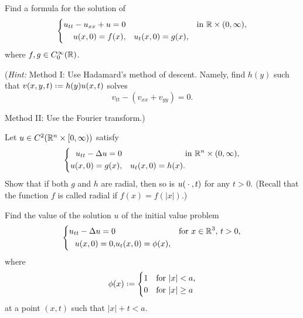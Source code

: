 \begin{problem}
  Find a formula for the solution of
  \[
    \left\{
      \begin{aligned}
        u_{tt}-u_{xx}+u=0&&&&\text{in \(\mathbb{R}\times(0,\infty)\),}\\
        u(x,0)=f(x),&&u_t(x,0)=g(x),
      \end{aligned}
    \right.
  \]
  where \(f,g\in C_0^\infty(\mathbb{R})\).

  \noindent (\emph{Hint:} Method I: Use Hadamard's method of
  descent. Namely, find \(h(y)\) such that \(v(x,y,t)\defeq h(y)u(x,t)\)
  solves
  \[
    v_{tt}-(v_{xx}+v_{yy})=0.
  \]

  \noindent Method II: Use the Fourier transform.)
\end{problem}
\begin{solution*}
\end{solution*}

\begin{problem}
  Let \(u\in C^2(\mathbb{R}^n\times[0,\infty))\) satisfy
  \[
    \left\{
      \begin{aligned}
        u_{tt}-\Delta u=0&&&\text{in \(\mathbb{R}^n\times(0,\infty),\)}\\
        u(x,0)=g(x),&&u_t(x,0)=h(x).
      \end{aligned}
    \right.
  \]
  Show that if both \(g\) and \(h\) are radial, then so is \(u({}\cdot{},t)\)
  for any \(t>0\). (Recall that the function \(f\) is called radial if
  \(f(x)=f(|x|)\).)
\end{problem}
\begin{solution*}
\end{solution*}

\begin{problem}
  Find the value of the solution \(u\) of the initial value problem
  \[
    \left\{
      \begin{aligned}
        u_{tt}-\Delta u=0&&&\text{for \(x\in\mathbb{R}^3\), \(t>0\),}\\
        u(x,0)=0,&u_t(x,0)=\phi(x),
      \end{aligned}
    \right.
  \]
  where
  \[
    \phi(x)\defeq
    \begin{cases}
      1&\text{for \(|x|<a\),}\\
      0&\text{for \(|x|\geq a\)}
    \end{cases}
  \]
  at a point \((x,t)\) such that \(|x|+t<a\).
\end{problem}
\begin{solution*}
\end{solution*}

